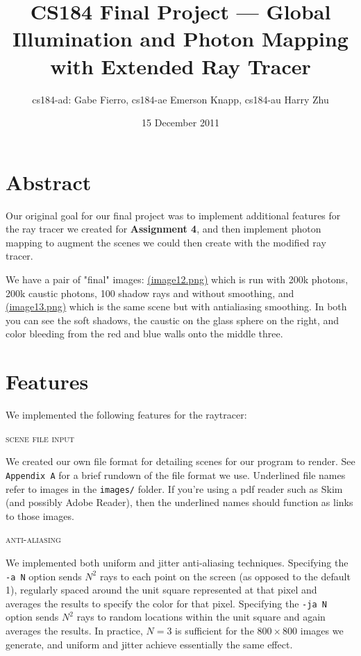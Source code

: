 \documentclass{article}
\title{CS184 Final Project --- Global Illumination and Photon Mapping with Extended Ray Tracer}
\author{cs184-ad: Gabe Fierro, cs184-ae Emerson Knapp, cs184-au Harry Zhu}
\date{15 December 2011}
\begin{document}
\maketitle

\section*{Abstract}

Our original goal for our final project was to implement additional features for the ray tracer we created for {\bf Assignment 4}, and then implement photon mapping to augment the scenes we could then create with the modified ray tracer. 

We have a pair of "final" images: \href{run://images/image12.png}{\underline{(image12.png)}} which is run with 200k photons, 200k caustic photons, 100 shadow rays and without smoothing, and \href{run://images/image13.png}{\underline{(image13.png)}} which is the same scene but with antialiasing smoothing. In both you can see the soft shadows, the caustic on the glass sphere on the right, and color bleeding from the red and blue walls onto the middle three.

\tableofcontents

\section{Features} %
\label{sec:features}

We implemented the following features for the raytracer:

\begin{center}\textsc{scene file input}\end{center} 
We created our own file format for detailing scenes for our program to render. See \verb+Appendix A+ for a brief rundown of the file format we use. Underlined file names refer to images in the \verb+images/+ folder. If you're using a pdf reader such as Skim (and possibly Adobe Reader), then the underlined names should function as links to those images.

\begin{center}\textsc{anti-aliasing}\end{center} 
We implemented both uniform and jitter anti-aliasing techniques. Specifying the \verb+-a N+ option sends $N^2$ rays to each point on the screen (as opposed to the default 1), regularly spaced around the unit square represented at that pixel and averages the results to specify the color for that pixel. Specifying the \verb+-ja N+ option sends $N^2$ rays to random locations within the unit square and again averages the results. In practice, $N=3$ is sufficient for the $800\times 800$ images we generate, and uniform and jitter achieve essentially the same effect.
\end{document}

